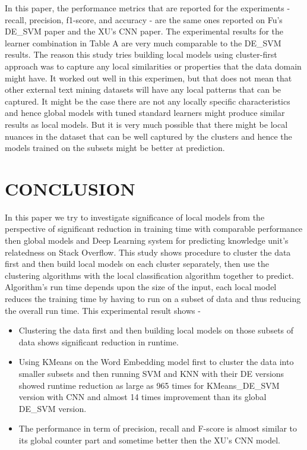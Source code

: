 \documentclass[sigconf]{acmart}
\theoremstyle{break}
\begin{document}
    In this paper, the performance metrics that  are reported for the experiments - recall, precision, f1-score, and accuracy - are the same ones reported on Fu's DE\_SVM paper and the XU's CNN  paper. The experimental results for the learner combination in Table A are very much comparable to the DE\_SVM results. The reason this study tries building local models using cluster-first approach was to capture any local similarities or properties that the data domain might have. It worked out well in this experimen, but that does not mean that other external text mining datasets will have any local patterns that can be captured. It might be the case there are not any locally specific characteristics and hence global models with tuned standard learners might produce similar results as local models. But it is very much possible that there might be local nuances in the dataset that can be well captured by the clusters and hence the models trained on the subsets might be better at prediction.


\section{CONCLUSION}
\label{sect:CONCLUSION}
    In this paper we try to investigate significance of local models from the perspective of significant reduction in training time with comparable performance then global models and Deep Learning system for predicting knowledge unit's relatedness on Stack Overflow. This study shows procedure to cluster the data first and then build local models on each cluster separately, then use the clustering algorithms with the local classification algorithm together to predict. Algorithm's run time depends upon the size of the input, each local model reduces the training time by having to run on a subset of data and thus reducing the overall run time. This experimental result shows -
    
    \begin{itemize}
        \item Clustering the data first and then building local models on those subsets of data shows significant reduction in runtime.
        \item Using KMeans on the Word Embedding model first to cluster the data into smaller subsets and then running SVM and KNN with their DE versions showed runtime reduction as large as 965 times for KMeans\_DE\_SVM version with CNN and almost 14 times improvement than its global DE\_SVM version.
        \item The performance in term of precision, recall and F-score is almost similar to its global counter part and sometime better then the XU's CNN model.
    \end{itemize}
    
\end{document}
